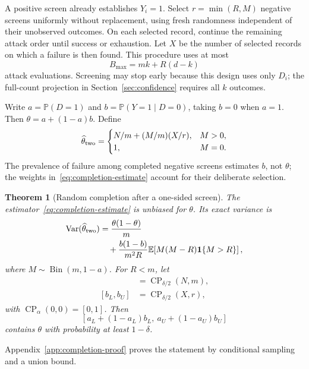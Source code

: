\documentclass[conference]{IEEEtran}
\newtheorem{theorem}{Theorem}
\newcommand{\E}{\mathbb{E}}
\newcommand{\Prob}{\mathbb{P}}
\newcommand{\ind}{\mathbf{1}}
\DeclareMathOperator{\Bin}{Bin}
\begin{document}
A positive screen already establishes $Y_i=1$. Select $r=\min(R,M)$ negative screens uniformly without replacement, using fresh randomness independent of their unobserved outcomes. On each selected record, continue the remaining attack order until success or exhaustion. Let $X$ be the number of selected records on which a failure is then found. This procedure uses at most
\begin{equation}\label{eq:completion-budget}
 B_{\max}=mk+R(d-k)
\end{equation}
attack evaluations. Screening may stop early because this design uses only $D_i$; the full-count projection in Section~\ref{sec:confidence} requires all $k$ outcomes.

Write $a=\Prob(D=1)$ and $b=\Prob(Y=1\mid D=0)$, taking $b=0$ when $a=1$. Then $\theta=a+(1-a)b$. Define
\begin{equation}\label{eq:completion-estimate}
 \widehat\theta_{\rm two}=
 \begin{cases}
 N/m+(M/m)(X/r),&M>0,\\
 1,&M=0.
 \end{cases}
\end{equation}
The prevalence of failure among completed negative screens estimates $b$, not $\theta$; the weights in~\eqref{eq:completion-estimate} account for their deliberate selection.

\begin{theorem}[Random completion after a one-sided screen]\label{thm:completion}
The estimator~\eqref{eq:completion-estimate} is unbiased for $\theta$. Its exact variance is
\begin{equation}\label{eq:completion-variance}
 \begin{aligned}
 \operatorname{Var}(\widehat\theta_{\rm two})
 &=\frac{\theta(1-\theta)}{m}\\
 &\quad+\frac{b(1-b)}{m^2R}
   \E\!\left[M(M-R)\ind\{M>R\}\right],
 \end{aligned}
\end{equation}
where $M\sim\Bin(m,1-a)$. For $R<m$, let
\begin{align}
 [a_L,a_U]&=\operatorname{CP}_{\delta/2}(N,m),\\
 [b_L,b_U]&=\operatorname{CP}_{\delta/2}(X,r),
\end{align}
with $\operatorname{CP}_{\alpha}(0,0)=[0,1]$. Then
\begin{equation}\label{eq:completion-ci}
 \left[a_L+(1-a_L)b_L,\ a_U+(1-a_U)b_U\right]
\end{equation}
contains $\theta$ with probability at least $1-\delta$.
\end{theorem}
Appendix~\ref{app:completion-proof} proves the statement by conditional sampling and a union bound.
\end{document}
